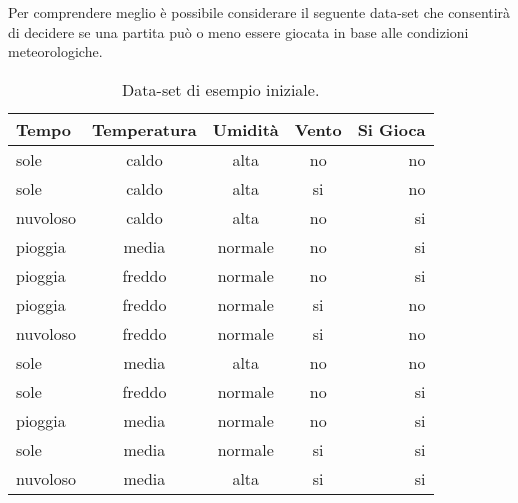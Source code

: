 Per comprendere meglio è possibile considerare il seguente data-set che consentirà di decidere se una partita può o meno essere giocata in base alle condizioni meteorologiche.

\begin{table}[h!]
	\begin{center}
		\begin{tabular}{l|c|c|c|r} %
			\textbf{Tempo} & \textbf{Temperatura} & \textbf{Umidità} & \textbf{Vento} & \textbf{Si Gioca}\\
			\hline
			sole     & caldo  & alta    & no & no \\
			sole     & caldo  & alta    & si & no \\
			nuvoloso & caldo  & alta    & no & si \\
			pioggia  & media  & normale & no & si \\
			pioggia  & freddo & normale & no & si \\
			pioggia  & freddo & normale & si & no \\
			nuvoloso & freddo & normale & si & no \\
			sole     & media  & alta    & no & no \\
			sole     & freddo & normale & no & si \\
			pioggia  & media  & normale & no & si \\
			sole     & media  & normale & si & si \\
			nuvoloso & media  & alta    & si & si 
		\end{tabular}
		\caption{Data-set di esempio iniziale.}
		\label{tab:data-set-example_1}
	\end{center}
\end{table}

